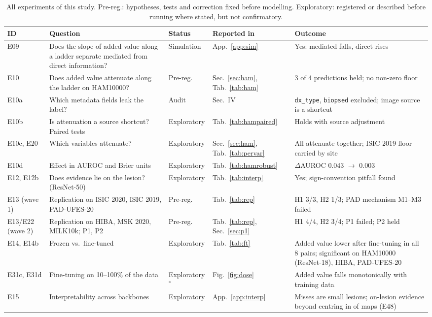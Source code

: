 \documentclass[conference]{IEEEtran}
\begin{document}
\begin{table}[tp]\centering\footnotesize
\caption{All experiments of this study. Pre-reg.: hypotheses, tests and correction fixed before modelling. Exploratory: registered or described before running where stated, but not confirmatory.}\label{tab:index}
\setlength{\tabcolsep}{3pt}
\begin{tabular}{p{1.4cm}p{5.1cm}p{1.85cm}p{2.9cm}p{5.0cm}}\toprule
ID & Question & Status & Reported in & Outcome\\\midrule
E09 & Does the slope of added value along a ladder separate mediated from direct information? & Simulation & App.~\ref{app:sim} & Yes: mediated falls, direct rises\\
E10 & Does added value attenuate along the ladder on HAM10000? & Pre-reg. & Sec.~\ref{sec:ham}, Tab.~\ref{tab:ham} & 3 of 4 predictions held; no non-zero floor\\
E10a & Which metadata fields leak the label? & Audit & Sec.~IV & \texttt{dx\_type}, \texttt{biopsed} excluded; image source is a shortcut\\
E10b & Is attenuation a source shortcut? Paired tests & Exploratory & Tab.~\ref{tab:hampaired} & Holds with source adjustment\\
E10c, E20 & Which variables attenuate? & Exploratory & Sec.~\ref{sec:ham}, Tab.~\ref{tab:pervar} & All attenuate together; ISIC 2019 floor carried by site\\
E10d & Effect in AUROC and Brier units & Exploratory & Tab.~\ref{tab:hamrobust} & $\Delta$AUROC 0.043 $\to$ 0.003\\
E12, E12b & Does evidence lie on the lesion? (ResNet-50) & Exploratory & Tab.~\ref{tab:interp} & Yes; sign-convention pitfall found\\
E13 (wave 1) & Replication on ISIC 2020, ISIC 2019, PAD-UFES-20 & Pre-reg. & Tab.~\ref{tab:rep} & H1 3/3, H2 1/3; PAD mechanism M1--M3 failed\\
E13/E22 (wave 2) & Replication on HIBA, MSK 2020, MILK10k; P1, P2 & Pre-reg. & Tab.~\ref{tab:rep}, Sec.~\ref{sec:p1} & H1 4/4, H2 3/4; P1 failed; P2 held\\
E14, E14b & Frozen vs.\ fine-tuned & Exploratory & Tab.~\ref{tab:ft} & Added value lower after fine-tuning in all 8 pairs; significant on HAM10000 (ResNet-18), HIBA, PAD-UFES-20\\
E31c, E31d & Fine-tuning on 10--100\% of the data & Exploratory$^\ast$ & Fig.~\ref{fig:dose} & Added value falls monotonically with training data\\
E15 & Interpretability across backbones & Exploratory & App.~\ref{app:interp} & Misses are small lesions; on-lesion evidence beyond centring in \SWAPrange{} of maps (E48)\\

\end{tabular}
\end{table}
\end{document}
